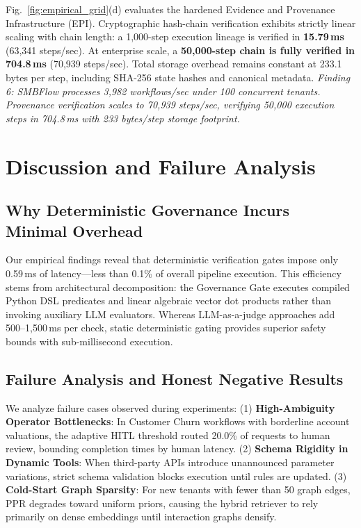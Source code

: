 \documentclass[conference]{IEEEtran}
\begin{document}
Fig.~\ref{fig:empirical_grid}(d) evaluates the hardened Evidence and Provenance Infrastructure (EPI). Cryptographic hash-chain verification exhibits strictly linear scaling with chain length: a 1,000-step execution lineage is verified in \textbf{15.79\,ms} (63,341 steps/sec). At enterprise scale, a \textbf{50,000-step chain is fully verified in 704.8\,ms} (70,939 steps/sec). Total storage overhead remains constant at 233.1 bytes per step, including SHA-256 state hashes and canonical metadata. \emph{Finding 6: SMBFlow processes 3,982 workflows/sec under 100 concurrent tenants. Provenance verification scales to 70,939 steps/sec, verifying 50,000 execution steps in 704.8\,ms with 233 bytes/step storage footprint.}

\section{Discussion and Failure Analysis}

\subsection{Why Deterministic Governance Incurs Minimal Overhead}
Our empirical findings reveal that deterministic verification gates impose only 0.59\,ms of latency---less than 0.1\% of overall pipeline execution. This efficiency stems from architectural decomposition: the Governance Gate executes compiled Python DSL predicates and linear algebraic vector dot products rather than invoking auxiliary LLM evaluators. Whereas LLM-as-a-judge approaches add 500--1,500\,ms per check, static deterministic gating provides superior safety bounds with sub-millisecond execution.

\subsection{Failure Analysis and Honest Negative Results}
We analyze failure cases observed during experiments:
(1) \textbf{High-Ambiguity Operator Bottlenecks}: In Customer Churn workflows with borderline account valuations, the adaptive HITL threshold routed 20.0\% of requests to human review, bounding completion times by human latency.
(2) \textbf{Schema Rigidity in Dynamic Tools}: When third-party APIs introduce unannounced parameter variations, strict schema validation blocks execution until rules are updated.
(3) \textbf{Cold-Start Graph Sparsity}: For new tenants with fewer than 50 graph edges, PPR degrades toward uniform priors, causing the hybrid retriever to rely primarily on dense embeddings until interaction graphs densify.
\end{document}
